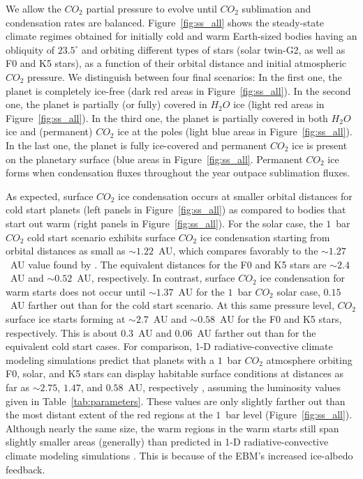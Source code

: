 \documentclass[fleqn,usenatbib]{mnras}
\begin{document}
We allow the $CO_{\mathrm{2}}$ partial pressure to evolve until $CO_{\mathrm{2}}$ sublimation and condensation rates are balanced. Figure~\ref{fig:ss_all} shows the steady-state climate regimes obtained for initially cold and warm Earth-sized bodies having an obliquity of $23.5^{\circ}$ and orbiting different types of stars (solar twin-G2, as well as F0 and K5 stars), as a function of their orbital distance and initial atmospheric $CO_{\mathrm{2}}$ pressure. We distinguish between four final scenarios: In the first one, the planet is completely ice-free (dark red areas in Figure~\ref{fig:ss_all}). In the second one, the planet is partially (or fully) covered in $H_{\mathrm{2}}O$ ice (light red areas in Figure~\ref{fig:ss_all}). In the third one, the planet is partially covered in both $H_{\mathrm{2}}O$ ice and (permanent) $CO_{\mathrm{2}}$ ice at the poles (light blue areas in Figure~\ref{fig:ss_all}). In the last one, the planet is fully ice-covered and permanent $CO_{\mathrm{2}}$ ice is present on the planetary surface (blue areas in Figure~\ref{fig:ss_all}. Permanent $CO_{\mathrm{2}}$ ice forms when condensation fluxes throughout the year outpace sublimation fluxes. 

As expected, surface $CO_{\mathrm{2}}$ ice condensation occurs at smaller orbital distances for cold start planets (left panels in Figure~\ref{fig:ss_all}) as compared to bodies that start out warm (right panels in Figure~\ref{fig:ss_all}).
For the solar case, the $1$~bar $CO_{\mathrm{2}}$ cold start scenario exhibits surface $CO_{\mathrm{2}}$ ice condensation starting from orbital distances as small as $\sim1.22$~AU, which compares favorably to the $\sim 1.27$~AU value found by \citet{Turbet2017}. The equivalent distances for the F0 and K5 stars are $\sim2.4$~AU and $\sim0.52$~AU, respectively.
In contrast, surface $CO_{\mathrm{2}}$ ice condensation for warm starts does not occur until $\sim1.37$~AU for the $1$~bar $CO_{\mathrm{2}}$ solar case, $0.15$~AU farther out than for the cold start scenario. At this same pressure level, $CO_{\mathrm{2}}$ surface ice starts forming at $\sim2.7$~AU and $\sim0.58$~AU for the F0 and K5 stars, respectively. This is about $0.3$~AU and $0.06$~AU farther out than for the equivalent cold start cases.
For comparison, 1-D radiative-convective climate modeling simulations predict that planets with a $1$~bar $CO_{\mathrm{2}}$ atmosphere orbiting F0, solar, and K5 stars can display habitable surface conditions at distances as far as $\sim 2.75$, $1.47$, and $0.58$~AU, respectively \citep{kasting1993, KumarKopparapu2013,Ramirez2018}, assuming the luminosity values given in Table~\ref{tab:parameters}. These values are only slightly farther out than the most distant extent of the red regions at the $1$~bar level (Figure~\ref{fig:ss_all}). Although nearly the same size, the warm regions in the warm starts still span slightly smaller areas (generally) than predicted in 1-D radiative-convective climate modeling simulations \citep{kasting1993, KumarKopparapu2013,Ramirez2018}. This is because of the EBM's increased ice-albedo feedback.
\end{document}
